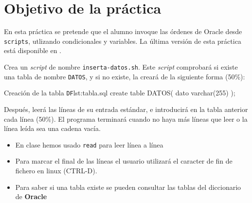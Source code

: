 
\usepackage{eurosym}


\renewcommand{\hmwkClass}{Administración y gestión de bases de datos}
\renewcommand{\hmwkTitle}{Actividad extraordinaria \textit{scripts} de \textit{shell}}


\usepackage{blindtext}








\primerapagina


\section{Objetivo de la práctica} 
En esta práctica se pretende que el alumno invoque las órdenes de Oracle desde \texttt{scripts}, utlizando condicionales y variables.
La última versión de esta práctica está disponible en .


\begin{homeworkProblem}
  Crea un \textit{script} de nombre \texttt{inserta-datos.sh}. Este \textit{script} comprobará si existe una tabla de nombre \texttt{DATOS}, y si no existe, la creará de la siguiente forma (50\%):
  
  \begin{listadoshell}{Creación de la tabla \texttt{DF}}{lst:tabla.sql}
    create table DATOS(
      dato varchar(255)
    );
  \end{listadoshell}
  
  Después, leerá las líneas de su entrada estándar, e introducirá en la tabla anterior cada línea (50\%). El programa terminará cuando no haya más líneas que leer o la línea leída sea una cadena vacía.

  \begin{Aviso}[Ayuda]
    \begin{itemize}
    \item En clase hemos usado \texttt{read} para leer línea a línea
    \item Para marcar el final de las líneas el usuario utilizará el caracter de fin de fichero en linux (CTRL-D).
    \item Para saber si una tabla existe se pueden consultar las tablas del diccionario de \textbf{Oracle}  
    \end{itemize}
  \end{Aviso}
  
\end{homeworkProblem}

